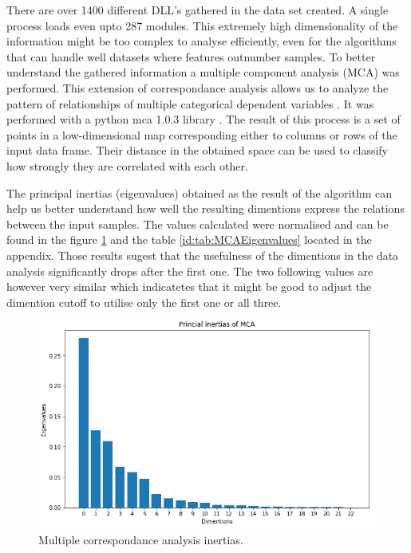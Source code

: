 \documentclass[a4paper,twoside,12pt]{book}
\begin{document}
There are over 1400 different DLL's gathered in the data set created. A single process loads 
even upto 287 modules. This extremely high dimensionality of the information might be too complex 
to analyse efficiently, even for the algorithms that can handle well datasets where features 
outnumber samples. To better understand the gathered information a multiple component 
analysis (MCA) was performed. This extension of correspondance analysis allows us to analyze the 
pattern of relationships of multiple categorical dependent variables \cite{bib:mca}. It was performed 
with a python mca 1.0.3 library \cite{bib:pymca}. The result of this process is a set of points in a 
low-dimensional map corresponding either to columns or rows of the input data frame. Their 
distance in the obtained space can be used to classify how strongly they are correlated with 
each other. 

The principal inertias (eigenvalues) obtained as the result of the algorithm can help us better 
understand how well the resulting dimentions express the relations between the input samples. 
The values calculated were normalised and can be found in the figure \ref{fig:mcaInertias} and 
the table \ref{id:tab:MCAEigenvalues} located in the appendix. Those results sugest that the 
usefulness of the dimentions in the data analysis significantly drops after the first one. The two
following values are however very similar which indicatetes that it might be good to adjust the 
dimention cutoff to utilise only the first one or all three.


\begin{figure}
	\centering
	\includegraphics[scale=0.9]{images/MCAEigenvalues}
	\caption{Multiple correspondance analysis inertias.}
	\label{fig:mcaInertias}
 \end{figure}
\end{document}
